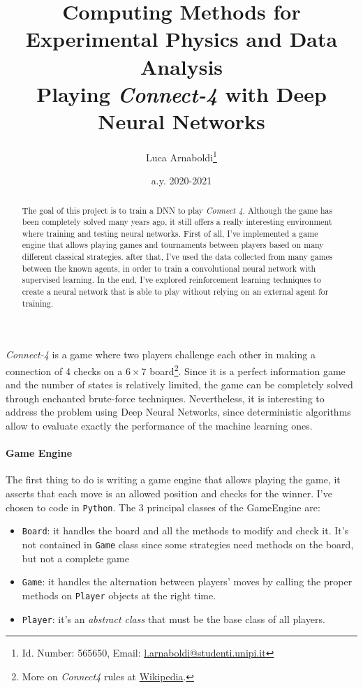 \documentclass{article}
\title{
  {\normalsize Computing Methods for Experimental Physics and Data Analysis}\\
  Playing \emph{Connect-4} with Deep Neural Networks
}
\author{Luca Arnaboldi\footnote{Id. Number: 565650, Email: \href{mailto:l.arnaboldi@studenti.unipi.it}{l.arnaboldi@studenti.unipi.it}}}
\date{a.y. 2020-2021}
\newcommand{\ipy}[1]{\texttt{#1}}
\begin{document}
  \maketitle
  \begin{abstract}
    The goal of this project is to train a DNN to play \emph{Connect 4}. Although the game has been completely solved many years ago, it still offers a really interesting environment where training and testing neural networks. First of all, I've implemented a game engine that allows playing games and tournaments between players based on many different classical strategies. after that, I've used the data collected from many games between the known agents, in order to train a convolutional neural network with supervised learning. In the end, I've explored reinforcement learning techniques to create a neural network that is able to play without relying on an external agent for training. 
  \end{abstract}
  
  \emph{Connect-4} is a game where two players challenge each other in making a connection of 4 checks on a \(6\times7\) board\footnote{More on \emph{Connect4} rules at \href{https://en.wikipedia.org/wiki/Connect_Four}{Wikipedia}.}. 
  Since it is a perfect information game and the number of states is relatively limited, the game can be completely solved through enchanted brute-force techniques. Nevertheless, it is interesting to address the problem using Deep Neural Networks, since deterministic algorithms allow to evaluate exactly the performance of the machine learning ones.
  
  \paragraph{Game Engine}
  The first thing to do is writing a game engine that allows playing the game, it asserts that each move is an allowed position and checks for the winner. I've chosen to code in \texttt{Python}. The 3 principal classes of the GameEngine are:
  \begin{itemize}
    \item \ipy{Board}: it handles the board and all the methods to modify and check it. It's not contained in \ipy{Game} class since some strategies need methods on the board, but not a complete game 
    \item \ipy{Game}: it handles the alternation between players' moves by calling the proper methods on \ipy{Player} objects at the right time. 
    \item \ipy{Player}: it's an \emph{abstract class} that must be the base class of all players.
  \end{itemize}
\end{document}
